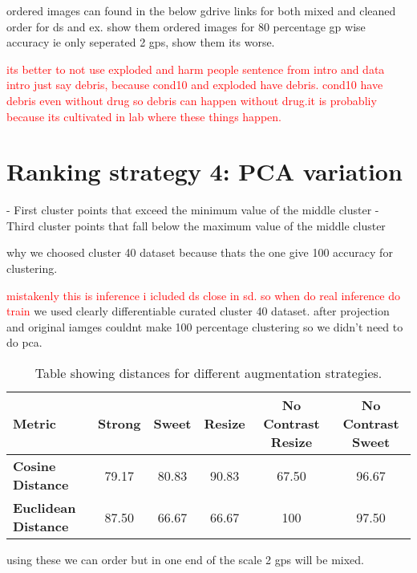 ordered images can found in the below gdrive links for both mixed and cleaned order for ds and ex.
show them ordered images for 80 percentage gp wise accuracy ie only seperated 2 gps, show them its worse.

\textcolor{red}{its better to not use exploded and harm people sentence from intro and data intro just say debris, because cond10 and exploded have debris. cond10 
have debris even without drug so debris can happen without drug.it is probabliy because its cultivated in lab where these things happen.} 

\section{ Ranking strategy 4: PCA variation}

- First cluster points that exceed the minimum value of the middle cluster
- Third cluster points that fall below the maximum value of the middle cluster

why we choosed cluster 40 dataset because thats the one give 100 accuracy for clustering.

\textcolor{red}{mistakenly this is inference i  icluded ds close in sd. so when do real inference do train}
we used clearly differentiable curated cluster 40 dataset. after projection and original iamges couldnt make 100 percentage clustering so we didn't need to do pca.
\begin{table}[H]
    \centering
    \begin{tabular}{@{}lccccc@{}}
    \toprule
    \textbf{Metric}          & \textbf{Strong} & \textbf{Sweet} & \textbf{Resize} & \textbf{No Contrast Resize} & \textbf{No Contrast Sweet} \\ \midrule
    \textbf{Cosine Distance} & 79.17               & 80.83              & 90.83               & 67.50                           & 96.67                          \\
    \textbf{Euclidean Distance} & 87.50           & 66.67              & 66.67               & 100                           & 97.50                          \\ \bottomrule
    \end{tabular}
    \caption{Table showing distances for different augmentation strategies.}
    \label{tab:distances}
  \end{table}

using these we can order but in one end of the scale 2 gps will be mixed.